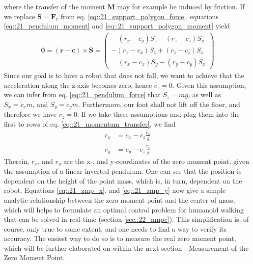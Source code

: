 where the transfer of the moment $\bm{M}$ may for example be induced by friction. If we replace $\bm{S}=\bm{F}_r$ from eq. \ref{eq::21_support_polygon_force}, equations \ref{eq::21_pendulum_moment} and \ref{eq::21_support_polygon_moment} yield 
\begin{align}
	\bm{0} = (\bm{r}-\bm{c})\times\bm{S} = \begin{pmatrix}
	\quad(r_y - c_y)S_z - (r_z - c_z)S_y \\
	-(r_x - c_x)S_z + (r_z - c_z)S_x \\
	\quad(r_x - c_x)S_y - (r_y - c_y)S_x
	\end{pmatrix}
	\label{eq::21_momentum_transfer}
\end{align}
Since our goal is to have a robot that does not fall, we want to achieve that the acceleration along the z-axis becomes zero, hence $\ddot{c}_z=0$. Given this assumption, we can infer from eq. \ref{eq::21_pendulum_force} that $S_z=mg$, as well as $S_x = \ddot{c}_xm$, and $S_y = \ddot{c}_ym$. Furthermore, our foot shall not lift off the floor, and therefore we have $r_z=0$. If we take these assumptions and plug them into the first to rows of eq. \ref{eq::21_momentum_transfer}, we find
\begin{align}
	r_x &= c_x - c_z\frac{\ddot{c}_x}{g}
	\label{eq::21_zmp_x}\\
	r_y &= c_y - c_z\frac{\ddot{c}_y}{g}
	\label{eq::21_zmp_y}
\end{align}
Therein, $r_x$, and $r_y$ are the x-, and y-coordinates of the zero moment point, given the assumption of a linear inverted pendulum. One can see that the position is dependent on the height of the point mass, which is, in turn, dependent on the robot. Equations \ref{eq::21_zmp_x}, and \ref{eq::21_zmp_y} now give a simple analytic relationship between the zero moment point and the center of mass, which will helps to formulate an optimal control problem for humanoid walking that can be solved in real-time (section \ref{sec::22_nmpc}). This simplification is, of course, only true to some extent, and one needs to find a way to verify its accuracy. The easiest way to do so is to measure the real zero moment point, which will be further elaborated on within the next section - Measurement of the Zero Moment Point.
\FloatBarrier
